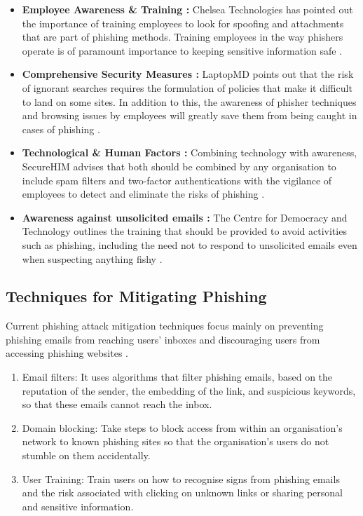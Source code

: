 \begin{itemize}
    \item \textbf{Employee Awareness \& Training :} Chelsea Technologies has pointed out the importance of training employees to look for spoofing and attachments that are part of phishing methods. Training employees in the way phishers operate is of paramount importance to keeping sensitive information safe \cite{DigitalGuardianPhishingPrevention}.

     \item \textbf{Comprehensive Security Measures :} LaptopMD points out that the risk of ignorant searches requires the formulation of policies that make it difficult to land on some sites. In addition to this, the awareness of phisher techniques and browsing issues by employees will greatly save them from being caught in cases of phishing \cite{DigitalGuardianPhishingPrevention}.
     
     \item \textbf{Technological \& Human Factors :} Combining technology with awareness, SecureHIM advises that both should be combined by any organisation to include spam filters and two-factor authentications with the vigilance of employees to detect and eliminate the risks of phishing \cite{DigitalGuardianPhishingPrevention}.
     
     \item \textbf{Awareness against unsolicited emails :} The Centre for Democracy and Technology outlines the training that should be provided to avoid activities such as phishing, including the need not to respond to unsolicited emails even when suspecting anything fishy \cite{CDTPhishingMitigation}.
     
     
\end{itemize}

\subsection{Techniques for Mitigating Phishing}

Current phishing attack mitigation techniques focus mainly on preventing phishing
emails from reaching users' inboxes and discouraging users from accessing
phishing websites \cite{Suzuki2021Phishing}.

\begin{enumerate}
    \item Email filters: It uses algorithms that filter phishing emails, based on the reputation of the sender, the embedding of the link, and suspicious keywords, so that these emails cannot reach the inbox.
    \item Domain blocking: Take steps to block access from within an organisation's network to known phishing sites so that the organisation's users do not stumble on them accidentally.
    \item User Training: Train users on how to recognise signs from phishing emails and the risk associated with clicking on unknown links or sharing personal and sensitive information.
\end{enumerate}

